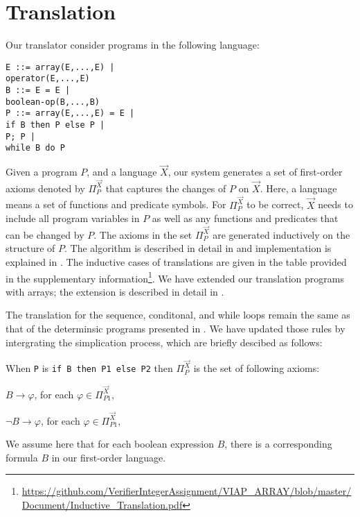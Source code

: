 \section{Translation}\label{sec:Translation}
Our translator consider programs in the following language:
\begin{verbatim}
E ::= array(E,...,E) |
operator(E,...,E)
B ::= E = E |
boolean-op(B,...,B)
P ::= array(E,...,E) = E | 
if B then P else P |
P; P |
while B do P 
\end{verbatim}

Given a program $P$, and a language $\vec{X}$, our system generates a set of first-order axioms denoted by $\Pi_P^{\vec{X}}$ that captures the changes of $P$ on $\vec{X}$. Here, a language means a set of functions and predicate symbols. For $\Pi_P^{\vec{X}}$ to be correct, $\vec{X}$ needs to include all program variables in $P$ as well as any functions and predicates that can be changed by $P$. The axioms in the set $\Pi_P^{\vec{X}}$ are generated inductively on the structure of $P$. The algorithm is described in detail in \cite{Lin20161}
and implementation is explained in 
\cite{DBLP:conf/synasc/pritom17}. The inductive cases of translations are given in the table provided in the supplementary information\footnote{\url{https://github.com/VerifierIntegerAssignment/VIAP_ARRAY/blob/master/Document/Inductive_Translation.pdf}}. We have extended our translation programs with arrays; the extension is described in detail in \cite{viap-array}.


The translation for the sequence, conditonal, and while loops remain the same as that of the determinsic programs presented in \cite{Lin20161}.  We have updated those rules by intergrating the simplication process, which are briefly descibed as follows:


\begin{defn} \label{Rule3} When \verb-P- is \verb-if B then P1 else P2- then $\Pi_P^{\vec{X}}$ is the set of following axioms:
	
\vspace{2mm}
$B \rightarrow \varphi$, for each $\varphi \in \Pi_{P1}^{\vec{X}},$

\vspace{2mm}
$\neg B \rightarrow \varphi$, for each $\varphi \in \Pi_{P1}^{\vec{X}},$
\vspace{2mm}

We assume here that for each boolean expression $B$, there is a corresponding formula $B$ in our first-order language.
	

\end{defn}


